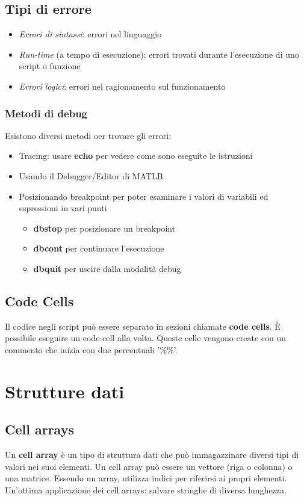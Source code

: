 \documentclass[a4paper, 10pt]{article}
\begin{document}
\subsection{Tipi di errore}
\begin{itemize}
\item \textit{Errori di sintassi}: errori nel linguaggio
\item \textit{Run-time} (a tempo di esecuzione): errori trovati durante l'esecuzione di uno script o funzione
\item \textit{Errori logici}: errori nel ragionamento sul funzionamento
\end{itemize}

\subsubsection{Metodi di debug}
Esistono diversi metodi oer trovare gli errori:
\begin{itemize}
\item Tracing: usare \textbf{echo} per vedere come sono eseguite le istruzioni
\item Usando il Debugger/Editor di MATLB
\item Posizionando breakpoint per poter esaminare i valori di variabili ed espressioni in vari punti
	\begin{itemize}
	\item \textbf{dbstop} per posizionare un breakpoint
	\item \textbf{dbcont} per continuare l'esecuzione
	\item \textbf{dbquit} per uscire dalla modalità debug
	\end{itemize}
\end{itemize}

\subsection{Code Cells}
Il codice negli script può essere separato in sezioni chiamate \textbf{code cells}. È possibile eseguire un code cell alla volta. Queste celle vengono create con un commento che inizia con due percentuali '\%\%'.

\newpage

\section{Strutture dati}
\subsection{Cell arrays}
Un \textbf{cell array} è un tipo di struttura dati che può immagazzinare diversi tipi di valori nei suoi elementi. Un cell array può essere un vettore (riga o colonna) o una matrice. Essendo un array, utilizza indici per riferirsi ai propri elementi.\\
Un'ottima applicazione dei cell arrays: salvare stringhe di diversa lunghezza.
\end{document}

